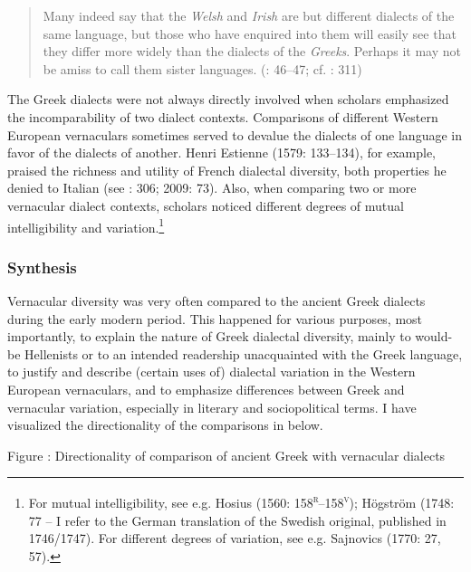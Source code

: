 \documentclass[output=paper]{langsci/langscibook}
\begin{document}
\begin{quote}
Many indeed say that the \textit{Welsh} and \textit{Irish} are but different dialects of the same language, but those who have enquired into them will easily see that they differ more widely than the dialects of the \textit{Greeks}. Perhaps it may not be amiss to call them sister languages. (\citealt{Malcolm1738}: 46–47; cf. \citealt{MacNicol1779}: 311)
\end{quote}

The Greek dialects were not always directly involved when scholars emphasized the incomparability of two dialect contexts. Comparisons of different Western European vernaculars sometimes served to devalue the dialects of one language in favor of the dialects of another. Henri Estienne (1579: 133–134), for example, praised the richness and utility of French dialectal diversity, both properties he denied to Italian (see \citealt{Swiggers1997}: 306; 2009: 73). Also, when comparing two or more vernacular dialect contexts, scholars noticed different degrees of mutual intelligibility and variation.\footnote{For mutual intelligibility, see e.g. Hosius (1560: 158\textsc{\textsuperscript{r}}\textsc{–158}\textsc{\textsuperscript{v}}); Högström (1748: 77 – I refer to the German translation of the Swedish original, published in 1746/1747). For different degrees of variation, see e.g. Sajnovics (1770: 27, 57).}

\subsubsection{Synthesis}
\hypertarget{Toc19704862}{}
Vernacular diversity was very often compared to the ancient Greek dialects during the early modern period. This happened for various purposes, most importantly,  to explain the nature of Greek dialectal diversity, mainly to would-be Hellenists or to an intended readership unacquainted with the Greek language,  to justify and describe (certain uses of) dialectal variation in the Western European vernaculars, and  to emphasize differences between Greek and vernacular variation, especially in literary and sociopolitical terms. I have visualized the directionality of the comparisons in  below.

\begin{stylecaption}
Figure : Directionality of comparison of ancient Greek with vernacular dialects
\end{stylecaption}
\end{document}
